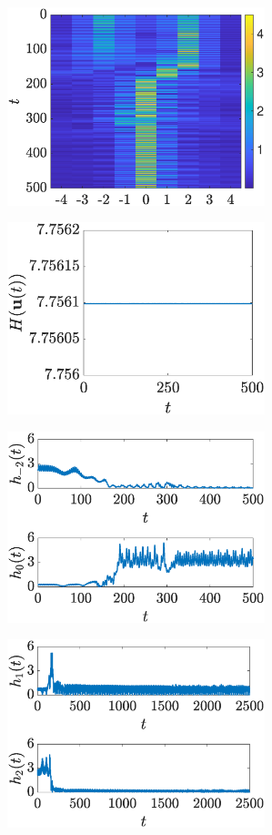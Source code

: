 \documentclass[12pt,reqno]{amsart}
\theoremstyle{definition}
\begin{document}
\begin{figure}
	\begin{center}
	\begin{subfigure}{0.45\linewidth}
		\caption{}
		\includegraphics[width=7.5cm]{N4ppcolormap.eps}
		\label{fig:timestepSGpplonga}
	\end{subfigure}
	\begin{subfigure}{0.45\linewidth}
		\caption{}
		\includegraphics[width=7.5cm]{N4ppH.eps}
		\label{fig:timestepSGpplongb}
	\end{subfigure}
	\begin{subfigure}{0.45\linewidth}
		\caption{}
		\includegraphics[width=7.5cm]{N4pph1.eps}
		\label{fig:timestepSGpplongc}
	\end{subfigure}
	\begin{subfigure}{0.45\linewidth}
		\caption{}
		\includegraphics[width=7.5cm]{N4pph2.eps}

\end{subfigure}
\end{center}
\end{figure}
\end{document}
